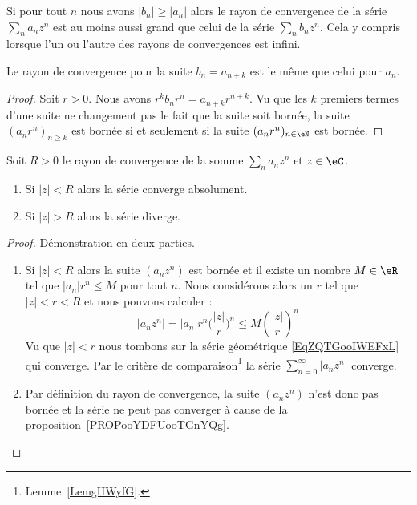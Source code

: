 \begin{remark}      \label{REMooYOTEooKvxHSf}
	Si pour tout \( n\) nous avons \( | b_n |\geq | a_n |\) alors le rayon de convergence de la série \( \sum_na_nz^n\) est au moins aussi grand que celui de la série \( \sum_nb_nz^n\). Cela y compris lorsque l'un ou l'autre des rayons de convergences est infini.
\end{remark}

\begin{lemma}    \label{LEMooVCTNooCQHkzs}
	Le rayon de convergence pour la suite \( b_n=a_{n+k}\) est le même que celui pour \( a_n\).
\end{lemma}

\begin{proof}
	Soit \( r>0\). Nous avons \( r^kb_nr^n=a_{n+k}r^{n+k}\). Vu que les \( k\) premiers termes d'une suite ne changement pas le fait que la suite soit bornée, la suite \( (a_nr^n)_{n\geq k}\) est bornée si et seulement si la suite \( (a_nr^n)_{n\in \eN}\) est bornée.
\end{proof}

\begin{lemma}   \label{LemmbWnFI}
	Soit \( R>0\) le rayon de convergence de la somme \( \sum_na_nz^n\) et \( z\in \eC\).
	\begin{enumerate}
		\item
		      Si \( | z |<R\) alors la série converge absolument.
		\item
		      Si \( | z |>R\) alors la série diverge.
	\end{enumerate}
\end{lemma}

\begin{proof}
	Démonstration en deux parties.
	\begin{enumerate}
		\item

		      Si \( | z |<R\) alors la suite \( (a_nz^n)\) est bornée et il existe un nombre \( M\in \eR\) tel que \( | a_n |r^n\leq M\) pour tout \( n\). Nous considérons alors un \( r\) tel que \( | z |<r<R\) et nous pouvons calculer :
		      \begin{equation}
			      | a_nz^n |=| a_n |r^n\big( \frac{ | z | }{ r } \big)^n\leq M\left( \frac{ | z | }{ r } \right)^n
		      \end{equation}
		      Vu que \( | z |<r\) nous tombons sur la série géométrique \eqref{EqZQTGooIWEFxL} qui converge. Par le critère de comparaison\footnote{Lemme~\ref{LemgHWyfG}.} la série \( \sum_{n=0}^{\infty}| a_nz^n |\) converge.

		\item
		      Par définition du rayon de convergence, la suite \( (a_nz^n)\) n'est donc pas bornée et la série ne peut pas converger à cause de la proposition~\ref{PROPooYDFUooTGnYQg}.
	\end{enumerate}
\end{proof}

